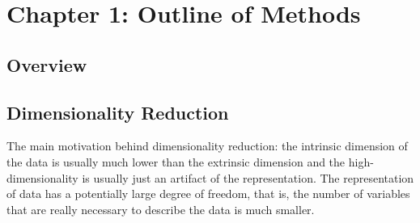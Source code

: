 \chapter{Chapter 1: Outline of Methods} 
\label{Chapter1}

\section{Overview}


\section{Dimensionality Reduction}
The main motivation behind dimensionality reduction: the intrinsic dimension of the data is usually much lower than the extrinsic dimension and the high-dimensionality is usually just an artifact of the representation. The representation of data has a potentially large degree of freedom, that is, the number of variables that are really necessary to describe the data is much smaller.

